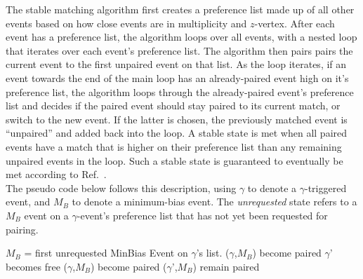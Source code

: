 The stable matching algorithm first creates a preference list made up of all other events based on how close events are in multiplicity and $z$-vertex. After each event has a preference list, the algorithm loops over all events, with a nested loop that iterates over each event's preference list. The algorithm then pairs  pairs the current event to the first unpaired event on that list. As the loop iterates, if an event towards the end of the main loop has an already-paired event high on it’s preference list, the algorithm loops through the already-paired event's preference list and decides if the paired event should stay paired to its current match, or switch to the new event. If the latter is chosen, the previously matched event is “unpaired” and added back into the loop. A stable state is met when all paired events have a match that is higher on their preference list than any remaining unpaired events in the loop. Such a stable state is guaranteed to eventually be met according to Ref.~\cite{GALE1985223}.\\

The pseudo code below follows this description, using \(\gamma\) to denote a \(\gamma\)-triggered event, and \(M_B\) to denote a minimum-bias event. The \textit{unrequested} state refers to a \(M_B\) event on a \(\gamma\)-event's preference list that has not yet been requested for pairing.\\

\FloatBarrier
\begin{algorithmic}
\State \(M_B\) = first unrequested MinBias Event on \(\gamma\)'s list.
\State (\(\gamma\),\(M_B\)) become paired
%
    \State \(\gamma\)' becomes free
    \State (\(\gamma\),\(M_B\)) become paired
    \Else
    \State (\(\gamma\)',\(M_B\)) remain paired
    \EndIf
\EndIf
\EndWhile
\EndProcedure
\end{algorithmic}

